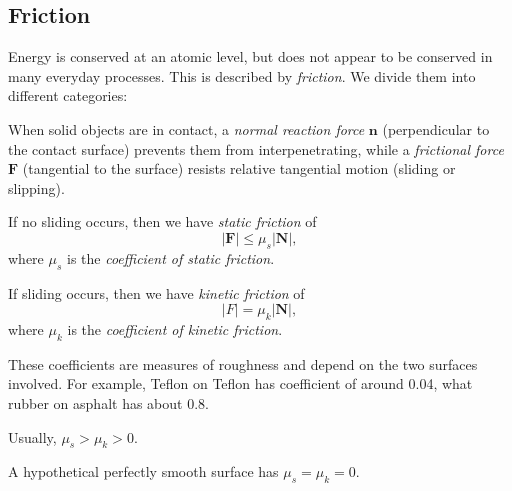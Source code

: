\documentclass[a4paper]{article}
\begin{document}
\subsection{Friction}
Energy is conserved at an atomic level, but does not appear to be conserved in many everyday processes. This is described by \emph{friction}. We divide them into different categories:
\begin{defi}
  When solid objects are in contact, a \emph{normal reaction force} $\mathbf{n}$ (perpendicular to the contact surface) prevents them from interpenetrating, while a \emph{frictional force} $\mathbf{F}$ (tangential to the surface) resists relative tangential motion (sliding or slipping).
  \begin{center}
  \end{center}
  If no sliding occurs, then we have \emph{static friction} of
  \[
    |\mathbf{F}| \leq \mu_s |\mathbf{N}|,
  \]
  where $\mu_s$ is the \emph{coefficient of static friction}.

  If sliding occurs, then we have \emph{kinetic friction} of 
  \[
    |F| = \mu_k |\mathbf{N}|,
  \]
  where $\mu_k$ is the \emph{coefficient of kinetic friction}.

  These coefficients are measures of roughness and depend on the two surfaces involved. For example, Teflon on Teflon has coefficient of around 0.04, what rubber on asphalt has about 0.8.

  Usually, $\mu_s > \mu_k > 0$.

  A hypothetical perfectly smooth surface has $\mu_s = \mu_k =0$.
\end{defi}
\end{document}
